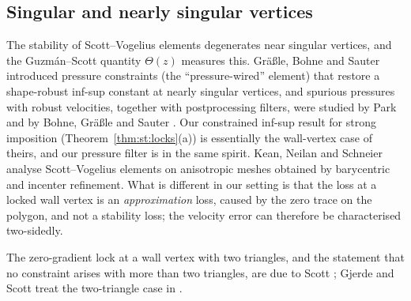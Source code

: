 \documentclass[pdflatex,sn-mathphys-num]{sn-jnl}
\theoremstyle{thmstyleone}
\theoremstyle{thmstylethree}
\begin{document}
\subsection{Singular and nearly singular vertices}
The stability of Scott--Vogelius elements degenerates near singular vertices, and the Guzm\'an--Scott quantity $\Theta(z)$ \cite{GuzmanScott2019} measures this. Gr\"a\ss le, Bohne and Sauter \cite{GrassleBohneSauter2024} introduced pressure constraints (the ``pressure-wired'' element) that restore a shape-robust inf-sup constant at nearly singular vertices, and spurious pressures with robust velocities, together with postprocessing filters, were studied by Park \cite{Park2020} and by Bohne, Gr\"a\ss le and Sauter \cite{BohneGrassleSauter2025}. Our constrained inf-sup result for strong imposition (Theorem~\ref{thm:st:locks}(a)) is essentially the wall-vertex case of theirs, and our pressure filter is in the same spirit. Kean, Neilan and Schneier \cite{KeanNeilanSchneier2022} analyse Scott--Vogelius elements on anisotropic meshes obtained by barycentric and incenter refinement. What is different in our setting is that the loss at a locked wall vertex is an \emph{approximation} loss, caused by the zero trace on the polygon, and not a stability loss; the velocity error can therefore be characterised two-sidedly.

The zero-gradient lock at a wall vertex with two triangles, and the statement that no constraint arises with more than two triangles, are due to Scott \cite[Theorem~1]{ScottPrize}; Gjerde and Scott treat the two-triangle case in \cite[\S3.4, App.~B]{GjerdeScott2024}.
\end{document}
